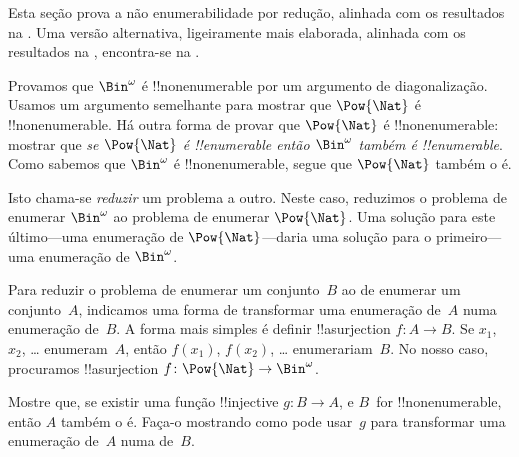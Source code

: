\documentclass[../../../include/open-logic-section]{subfiles}
\begin{document}


\begin{editorial}
  Esta seção prova a não enumerabilidade por redução, alinhada com os resultados
  na . Uma versão alternativa, ligeiramente mais elaborada,
  alinhada com os resultados na , encontra-se na
  .
\end{editorial}

Provamos que $\Bin^\omega$ é !!{nonenumerable} por um argumento de
diagonalização. Usamos um argumento semelhante para mostrar que $\Pow{\Nat}$ é
!!{nonenumerable}. Há outra forma de provar que $\Pow{\Nat}$ é
!!{nonenumerable}: mostrar que \emph{se $\Pow{\Nat}$ é !!{enumerable} então
$\Bin^\omega$ também é !!{enumerable}}. Como sabemos que $\Bin^\omega$ é
!!{nonenumerable}, segue que $\Pow{\Nat}$ também o é.

Isto chama-se \emph{reduzir} um problema a outro. Neste caso, reduzimos o problema
de enumerar $\Bin^\omega$ ao problema de enumerar $\Pow{\Nat}$. Uma solução para
este último---uma enumeração de $\Pow{\Nat}$---daria uma solução para o
primeiro---uma enumeração de $\Bin^\omega$.

Para reduzir o problema de enumerar um conjunto~$B$ ao de enumerar um
conjunto~$A$, indicamos uma forma de transformar uma enumeração de~$A$ numa
enumeração de~$B$. A forma mais simples é definir !!a{surjection} $f\colon A \to
B$. Se $x_1$, $x_2$, \dots{} enumeram~$A$, então $f(x_1)$, $f(x_2)$, \dots{}
enumerariam~$B$. No nosso caso, procuramos !!a{surjection} $f\colon \Pow{\Nat}
\to \Bin^\omega$.

\begin{prob}
Mostre que, se existir uma função !!{injective} $g\colon B \to A$, e $B$~for
!!{nonenumerable}, então $A$ também o é. Faça-o mostrando como pode usar~$g$ para
transformar uma enumeração de~$A$ numa de~$B$.
\end{prob}
\end{document}
